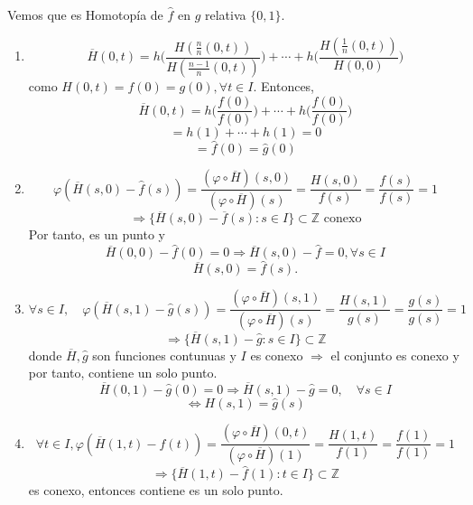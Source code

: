 \begin{dem}
\begin{itemize}
      Vemos que es Homotopía de $\hat{ f }$ en $\hat{ g }$ relativa $\{ 0, 1 \}$.
      \begin{enumerate}[label=(\roman*)]
        \item 
          \[ 
            \overline{H}(0,t) = h \Bigg ( \frac{H(\frac{n}{n}(0,t))}{H(\frac{n - 1}{n}(0,t))} \Bigg ) + \cdots + h \Bigg ( \frac{H(\frac{1}{n}(0,t))}{H(0, 0)} \Bigg )
          \] 
          como $H(0, t) = f(0) = g(0), \forall t \in I$. Entonces,
          \[ 
            \overline{H}(0, t) = h \Bigg (\frac{f(0)}{f(0)} \Bigg ) + \cdots + h \Bigg (\frac{f(0)}{f(0)} \Bigg )
          \] 
          \[ 
            = h(1) + \cdots + h(1) = 0
          \] 
          \[ 
            = \hat{ f }(0) = \hat{ g }(0) 
          \] 
        \item 
          \[ 
            \varphi(\overline{H}(s, 0) - \hat{ f }(s)) = \frac{(\varphi \circ \overline{H})(s, 0)}{(\varphi \circ \overline{H})(s)} = \frac{H(s,0)}{f(s)} = \frac{f(s)}{f(s)} = 1
          \] 
          \[ 
            \Rightarrow \{ \overline{H}(s,0) - \overline{f}(s) : s \in I \}  \subset \mathbb{Z} \text{ conexo}
          \] 
          Por tanto, es un punto y
          \[ 
            \overline{H}(0, 0) - \hat{ f }(0) = 0 \Rightarrow \overline{H}(s, 0) - \hat{ f } = 0, \forall s \in I
          \] 
          \[ 
            \overline{H}(s, 0) = \hat{ f }(s).
          \] 
        \item
          \[
            \forall s \in I, \quad \varphi(\overline{H}(s, 1) - \hat{ g }(s)) = \frac{(\varphi \circ \overline{H})(s, 1)}{(\varphi \circ \overline{H})(s)} = \frac{H(s,1)}{g(s)} = \frac{g(s)}{g(s)} = 1
          \]
          \[ 
            \Rightarrow \{ \overline{H}(s,1) - \hat{ g } : s \in I \} \subset \mathbb{Z} 
          \] 
          donde $\overline{H}, \hat{ g }$ son funciones contunuas y $I$ es conexo $\Rightarrow $ el conjunto es conexo y por tanto, contiene un solo punto.
          \[ 
            \overline{H}(0,1) - \hat{ g }(0) = 0 \Rightarrow \overline{H}(s,1) - \hat{ g } = 0, \quad \forall s \in I 
          \] 
          \[ 
            \Leftrightarrow H(s,1) = \hat{ g }(s)
          \] 
        \item 
          \[ 
            \forall t \in I, \varphi(\overline{H}(1,t) - \hat{ f }(t)) = \frac{(\varphi \circ \overline{H})(0, t)}{(\varphi \circ \overline{H})(1)} = \frac{H(1,t)}{f(1)} = \frac{f(1)}{f(1)} = 1
          \] 
          \[ 
            \Rightarrow \{ \overline{H}(1,t) - \hat{ f }(1) : t \in I \} \subset \mathbb{Z}
          \] 
          es conexo, entonces contiene es un solo punto.

\end{enumerate}
\end{itemize}
\end{dem}

